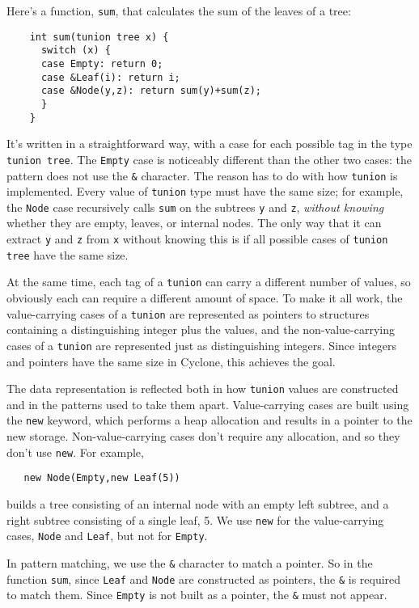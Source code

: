 Here's a function, \texttt{sum}, that calculates the sum of the leaves
of a tree:
\begin{verbatim}
    int sum(tunion tree x) {
      switch (x) {
      case Empty: return 0;
      case &Leaf(i): return i;
      case &Node(y,z): return sum(y)+sum(z);
      }
    }
\end{verbatim}

It's written in a straightforward way, with a case for each possible
tag in the type \texttt{tunion tree}.  The \texttt{Empty} case is
noticeably different than the other two cases: the pattern does not
use the \texttt{\&} character.  The reason has to do with how
\texttt{tunion} is implemented.  Every value of \texttt{tunion} type
must have the same size; for example, the \texttt{Node} case
recursively calls \texttt{sum} on the subtrees \texttt{y} and
\texttt{z}, \emph{without knowing} whether they are empty, leaves, or
internal nodes.  The only way that it can extract \texttt{y} and
\texttt{z} from \texttt{x} without knowing this is if all possible
cases of \texttt{tunion tree} have the same size.

At the same time, each tag of a \texttt{tunion} can carry a different
number of values, so obviously each can require a different amount of
space.  To make it all work, the value-carrying cases of a
\texttt{tunion} are represented as pointers to structures containing a
distinguishing integer plus the values, and the non-value-carrying
cases of a \texttt{tunion} are represented just as distinguishing
integers.  Since integers and pointers have the same size in Cyclone,
this achieves the goal.

The data representation is reflected both in how \texttt{tunion}
values are constructed and in the patterns used to take them apart.
Value-carrying cases are built using the \texttt{new} keyword, which
performs a heap allocation and results in a pointer to the new
storage.  Non-value-carrying cases don't require any allocation, and
so they don't use \texttt{new}.  For example,
\begin{verbatim}
   new Node(Empty,new Leaf(5))
\end{verbatim}
builds a tree consisting of an internal node with an empty left
subtree, and a right subtree consisting of a single leaf, 5.  We use
\texttt{new} for the value-carrying cases, \texttt{Node} and
\texttt{Leaf}, but not for \texttt{Empty}.

In pattern matching, we use the \texttt{\&} character to match a
pointer.  So in the function \texttt{sum}, since \texttt{Leaf} and
\texttt{Node} are constructed as pointers, the \texttt{\&} is required
to match them.  Since \texttt{Empty} is not built as a pointer, the
\texttt{\&} must not appear.


